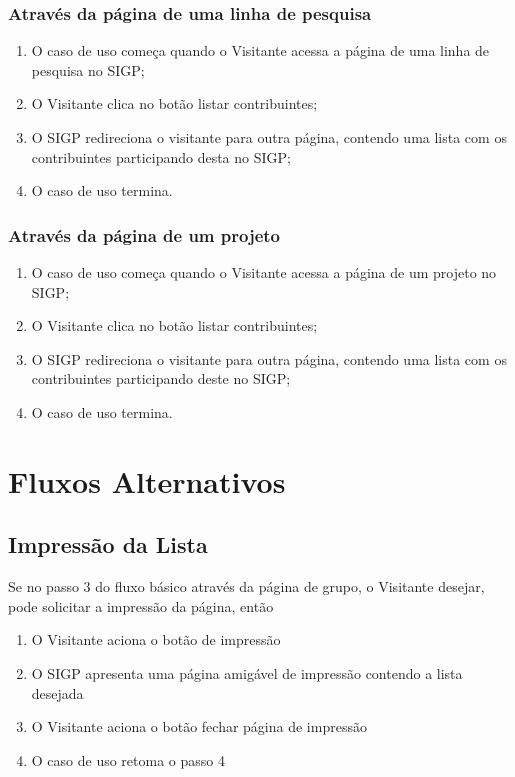 \documentclass[11pt, a4paper,oneside]{book}
\begin{document}
\subsubsection{Através da página de uma linha de pesquisa}
\begin{enumerate}
\item O caso de uso começa quando o Visitante acessa a página de uma linha de pesquisa no SIGP;
\item O Visitante clica no botão listar contribuintes;
\item O SIGP redireciona o visitante para outra página, contendo uma lista com os contribuintes participando desta no SIGP;
\item O caso de uso termina.
\end{enumerate}

\subsubsection{Através da página de um projeto}
\begin{enumerate}
\item O caso de uso começa quando o Visitante acessa a página de um projeto no SIGP;
\item O Visitante clica no botão listar contribuintes;
\item O SIGP redireciona o visitante para outra página, contendo uma lista com os contribuintes participando deste no SIGP;
\item O caso de uso termina.
\end{enumerate}

\section{Fluxos Alternativos}

\subsection{Impressão da Lista}
Se no passo $3$ do fluxo básico através da página de grupo, o Visitante desejar, pode solicitar a impressão da página, então

\begin{enumerate}
\item O Visitante aciona o botão de impressão
\item O SIGP apresenta uma página amigável de impressão contendo a lista desejada
\item O Visitante aciona o botão fechar página de impressão
\item O caso de uso retoma o passo 4
\end{enumerate}
\end{document}
